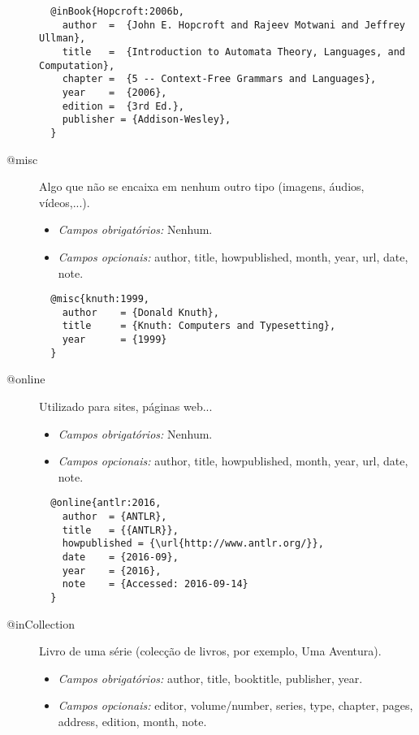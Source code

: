 \documentclass{article}%
\begin{document}
\begin{description}
  \begin{lstlisting}
  @inBook{Hopcroft:2006b,
    author  =  {John E. Hopcroft and Rajeev Motwani and Jeffrey Ullman},
    title   =  {Introduction to Automata Theory, Languages, and Computation},
    chapter =  {5 -- Context-Free Grammars and Languages},
    year    =  {2006},
    edition =  {3rd Ed.},
    publisher = {Addison-Wesley},
  }
  \end{lstlisting}


  \item[@misc]  Algo que não se encaixa em nenhum outro tipo (imagens, áudios, vídeos,...).
  \begin{itemize}
    \item \emph{Campos obrigatórios:} Nenhum.
    \item \emph{Campos opcionais:} author, title, howpublished, month, year, url, date, note.

  \end{itemize}

  \begin{lstlisting}
  @misc{knuth:1999,
    author    = {Donald Knuth},
    title     = {Knuth: Computers and Typesetting},
    year      = {1999}
  }
  \end{lstlisting}


\item[@online]  Utilizado para sites, páginas web...
\begin{itemize}
    \item \emph{Campos obrigatórios:} Nenhum.
    \item \emph{Campos opcionais:} author, title, howpublished, month, year, url, date, note.
  \end{itemize}

  \begin{lstlisting}
  @online{antlr:2016,
    author  = {ANTLR},
    title   = {{ANTLR}},
    howpublished = {\url{http://www.antlr.org/}},
    date    = {2016-09},
    year    = {2016},
    note    = {Accessed: 2016-09-14}
  }
  \end{lstlisting}


  \item[@inCollection]  Livro de uma série (colecção de livros, por exemplo, Uma Aventura).
  \begin{itemize}
    \item \emph{Campos obrigatórios:} author, title, booktitle, publisher, year.
    \item \emph{Campos opcionais:} editor, volume/number, series, type, chapter, pages, address, edition, month, note.
  \end{itemize}


\end{description}
\end{document}
